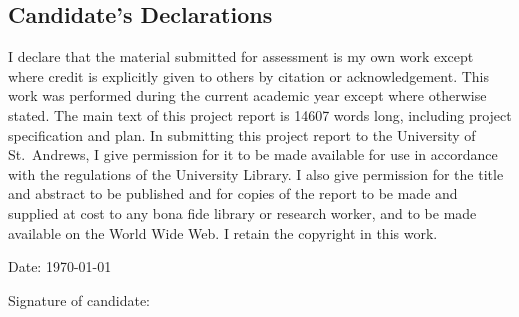 %
%

\begin{declaration}
\subsection*{Candidate's Declarations}

I declare that the material submitted for assessment is my own work except where credit is explicitly given to others by citation or acknowledgement. This work was performed during the current academic year except where otherwise stated.
The main text of this project report is 14607 words long, including project specification and plan. In submitting this project report to the University of St.\ Andrews, I give permission for it to be made available for use in accordance with the regulations of the University Library. I also give permission for the title and abstract to be published and for copies of the report to be made and supplied at cost to any bona fide library or research worker, and to be made available on the World Wide Web. I retain the copyright in this work.

\vspace{24pt}

Date: \today
\vspace{16pt}

Signature of candidate:
\vspace{48pt}

\end{declaration}